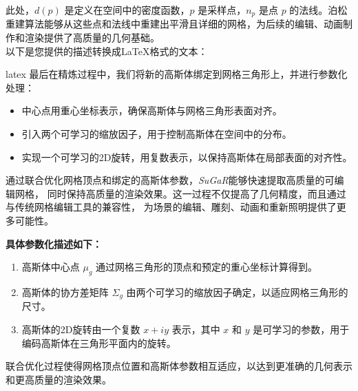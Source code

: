 \documentclass{nwputhesis}
\begin{document}
此处，\( d(p) \) 是定义在空间中的密度函数，\( p \) 是采样点，\( n_p \) 是点 \( p \) 的法线。泊松
重建算法能够从这些点和法线中重建出平滑且详细的网格，为后续的编辑、动画制作和渲染提供了高质量的几何基础。
\\
\indent
以下是您提供的描述转换成LaTeX格式的文本：

latex
最后在精炼过程中，我们将新的高斯体绑定到网格三角形上，并进行参数化处理：

\begin{itemize}
    \item 中心点用重心坐标表示，确保高斯体与网格三角形表面对齐。
    \item 引入两个可学习的缩放因子，用于控制高斯体在空间中的分布。
    \item 实现一个可学习的2D旋转，用复数表示，以保持高斯体在局部表面的对齐性。
\end{itemize}

通过联合优化网格顶点和绑定的高斯体参数，\textit{SuGaR}能够快速提取高质量的可编辑网格，
同时保持高质量的渲染效果。这一过程不仅提高了几何精度，而且通过与传统网格编辑工具的兼容性，
为场景的编辑、雕刻、动画和重新照明提供了更多可能性。

\textbf{具体参数化描述如下：}

\begin{enumerate}
    \item 高斯体中心点 \( \mu_g \) 通过网格三角形的顶点和预定的重心坐标计算得到。
    \item 高斯体的协方差矩阵 \( \Sigma_g \) 由两个可学习的缩放因子确定，以适应网格三角形的尺寸。
    \item 高斯体的2D旋转由一个复数 \( x + iy \) 表示，其中 \( x \) 和 \( y \) 是可学习的参数，用于编码高斯体在三角形平面内的旋转。
\end{enumerate}

联合优化过程使得网格顶点位置和高斯体参数相互适应，以达到更准确的几何表示和更高质量的渲染效果。
\end{document}
